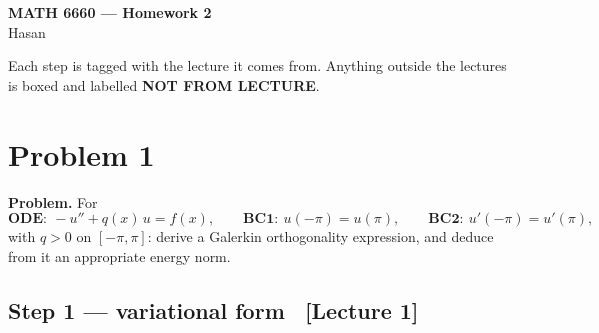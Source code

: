 \documentclass[11pt]{article}
\newcommand{\src}[1]{{\small\color{black!55}\textsf{[#1]}}}
\begin{document}
\begin{center}
  {\large\textbf{MATH 6660 --- Homework 2}}\\[0.2em]
  Hasan
\end{center}
\vspace{0.2em}

{\small\color{black!60}
Each step is tagged with the lecture it comes from. Anything outside the
lectures is boxed and labelled \textbf{NOT FROM LECTURE}.}

\vspace{0.8em}
\section*{Problem 1}

\textbf{Problem.} For
\begin{equation}\label{eq:ode}
  \textbf{ODE}:\ -u''+q(x)\,u=f(x),
  \qquad
  \textbf{BC1}:\ u(-\pi)=u(\pi),
  \qquad
  \textbf{BC2}:\ u'(-\pi)=u'(\pi),
\end{equation}
with $q>0$ on $[-\pi,\pi]$: derive a Galerkin orthogonality expression, and
deduce from it an appropriate energy norm.

\subsection*{Step 1 --- variational form \ \src{Lecture 1}}
\end{document}
